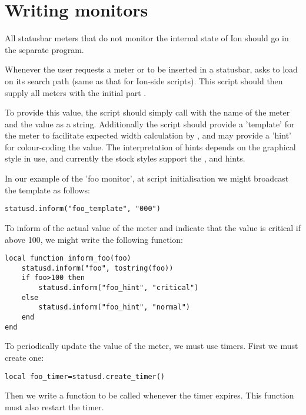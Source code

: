 
\section{Writing  monitors}
\label{sec:statusd}

All statusbar meters that do not monitor the internal state of Ion should
go in the separate  program. 

Whenever the user requests a meter  or  to 
be  inserted in a statusbar,  asks  
to load  on its search path (same as that for Ion-side 
scripts). This script should then supply all meters with the initial part
.

To provide this value, the script should simply call 
with the name of the meter and the value as a string.
Additionally the script should provide a 'template' for the meter to
facilitate expected width calculation by , and
may provide a 'hint' for colour-coding the value. The interpretation
of hints depends on the graphical style in use, and currently the
stock styles support the ,  and 
 hints.


In our example of the 'foo monitor', at script initialisation we might broadcast
the template as follows:

\begin{verbatim}
statusd.inform("foo_template", "000")
\end{verbatim}

To inform  of the actual value of the meter and
indicate that the value is critical if above 100, we might write the
following function:

\begin{verbatim}
local function inform_foo(foo)
    statusd.inform("foo", tostring(foo))
    if foo>100 then
        statusd.inform("foo_hint", "critical")
    else
        statusd.inform("foo_hint", "normal")
    end
end    
\end{verbatim}
    
To periodically update the value of the meter, we must use timers.
First we must create one:

\begin{verbatim}
local foo_timer=statusd.create_timer()
\end{verbatim}

Then we write a function to be called whenever the timer expires.
This function must also restart the timer.

